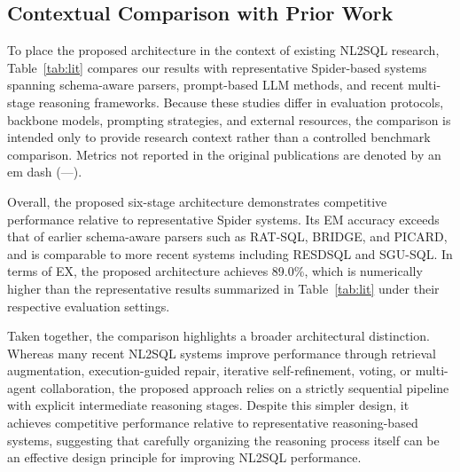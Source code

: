 \documentclass{svproc}
\begin{document}
\subsection{Contextual Comparison with Prior Work}
\label{subsec:lit}


To place the proposed architecture in the context of existing NL2SQL research, Table~\ref{tab:lit} compares our results with representative Spider-based systems spanning schema-aware parsers, prompt-based LLM methods, and recent multi-stage reasoning frameworks. Because these studies differ in evaluation protocols, backbone models, prompting strategies, and external resources, the comparison is intended only to provide research context rather than a controlled benchmark comparison. Metrics not reported in the original publications are denoted by an em dash (---).

Overall, the proposed six-stage architecture demonstrates competitive performance relative to representative Spider systems. Its EM accuracy exceeds that of earlier schema-aware parsers such as RAT-SQL, BRIDGE, and PICARD, and is comparable to more recent systems including RESDSQL and SGU-SQL. In terms of EX, the proposed architecture achieves 89.0\%, which is numerically higher than the representative results summarized in Table~\ref{tab:lit} under their respective evaluation settings.

Taken together, the comparison highlights a broader architectural distinction. Whereas many recent NL2SQL systems improve performance through retrieval augmentation, execution-guided repair, iterative self-refinement, voting, or multi-agent collaboration, the proposed approach relies on a strictly sequential pipeline with explicit intermediate reasoning stages. Despite this simpler design, it achieves competitive performance relative to representative reasoning-based systems, suggesting that carefully organizing the reasoning process itself can be an effective design principle for improving NL2SQL performance.
\end{document}
